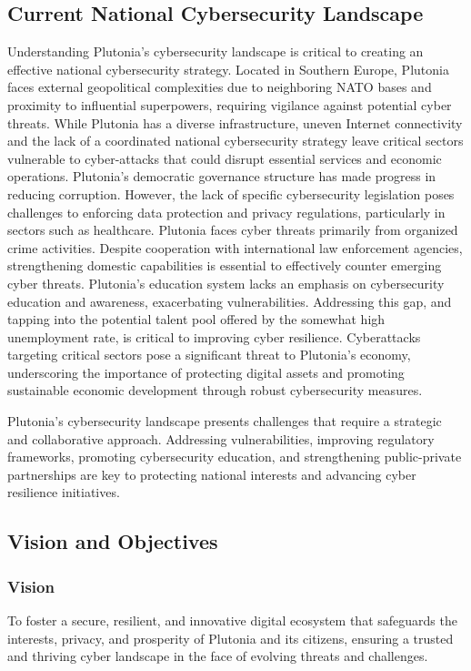 \documentclass[
	a4paper, %
	12pt, %
]{CSSullivanBusinessReport}
\begin{document}
\begin{fullwidth}
\begin{justify}
\subsection{Current National Cybersecurity Landscape}
Understanding Plutonia's cybersecurity landscape is critical to creating an effective national cybersecurity strategy. Located in Southern Europe, Plutonia faces external geopolitical complexities due to neighboring NATO bases and proximity to influential superpowers, requiring vigilance against potential cyber threats. While Plutonia has a diverse infrastructure, uneven Internet connectivity and the lack of a coordinated national cybersecurity strategy leave critical sectors vulnerable to cyber-attacks that could disrupt essential services and economic operations. Plutonia's democratic governance structure has made progress in reducing corruption. However, the lack of specific cybersecurity legislation poses challenges to enforcing data protection and privacy regulations, particularly in sectors such as healthcare. Plutonia faces cyber threats primarily from organized crime activities. Despite cooperation with international law enforcement agencies, strengthening domestic capabilities is essential to effectively counter emerging cyber threats. Plutonia's education system lacks an emphasis on cybersecurity education and awareness, exacerbating vulnerabilities. Addressing this gap, and tapping into the potential talent pool offered by the somewhat high unemployment rate, is critical to improving cyber resilience. Cyberattacks targeting critical sectors pose a significant threat to Plutonia's economy, underscoring the importance of protecting digital assets and promoting sustainable economic development through robust cybersecurity measures. 

Plutonia's cybersecurity landscape presents challenges that require a strategic and collaborative approach. Addressing vulnerabilities, improving regulatory frameworks, promoting cybersecurity education, and strengthening public-private partnerships are key to protecting national interests and advancing cyber resilience initiatives.

\subsection{Vision and Objectives}
\subsubsection{Vision} To foster a secure, resilient, and innovative digital ecosystem that safeguards the interests, privacy, and prosperity of Plutonia and its citizens, ensuring a trusted and thriving cyber landscape in the face of evolving threats and challenges.

\end{justify}
\end{fullwidth}
\end{document}
